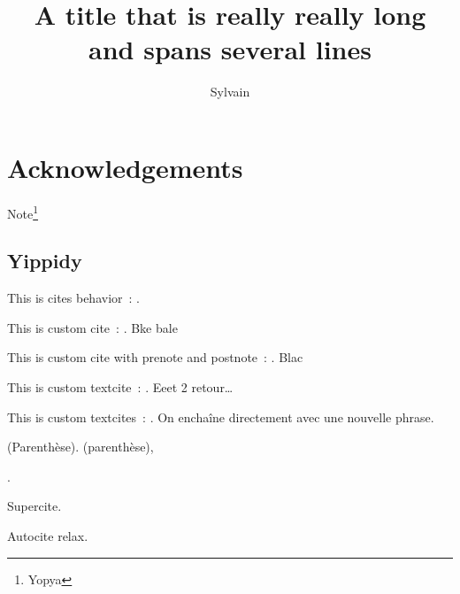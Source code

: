\documentclass[
    notes    = foot,
    science  = true,
    bibliography = numbered,
]{tufte-style-thesis}
\title{A title that is really really long and spans several lines}
\author{Sylvain}
\begin{document}
\maketitle

\chapter{Acknowledgements}

Note\footnote{Yopya}


\section{Yippidy}


This is cites behavior~: \cites[prenote][postnote]{chandrasekharanMicroscaleDifferentialCapacitive2011}[prenote2][postnote2]{CarterABC,einstein1915allgemeinen, TufteTvdq}.

This is custom cite~: \cite{chandrasekharanMicroscaleDifferentialCapacitive2011,einstein1915allgemeinen}. Bke bale

This is custom cite with prenote and postnote~: \cite[prenote][\ppno~5--15]{StExupery}. Blac

This is custom textcite~: \textcite[prenote][]{StExupery}. Eeet 2 retour\dots

This is custom textcites~: \textcites[prenote][postnote]{chandrasekharanMicroscaleDifferentialCapacitive2011}[prenote n\textsuperscript{o}2][]{CarterABC,einstein1915allgemeinen, TufteTvdq,TufteTvdqB}. On enchaîne directement avec une nouvelle phrase.

(Parenthèse). (parenthèse),

\textcites[First work done by][\ppno~5--15]{chandrasekharanMicroscaleDifferentialCapacitive2011}[has been continued by][]{CarterABC,einstein1915allgemeinen, TufteTvdq}.


Supercite\supercite{chandrasekharanMicroscaleDifferentialCapacitive2011,TufteTvdq,
CarterABC,einstein1915allgemeinen}.

Autocite relax\autocite{chandrasekharanMicroscaleDifferentialCapacitive2011,TufteTvdq,
CarterABC,einstein1915allgemeinen}\relax .
\end{document}
